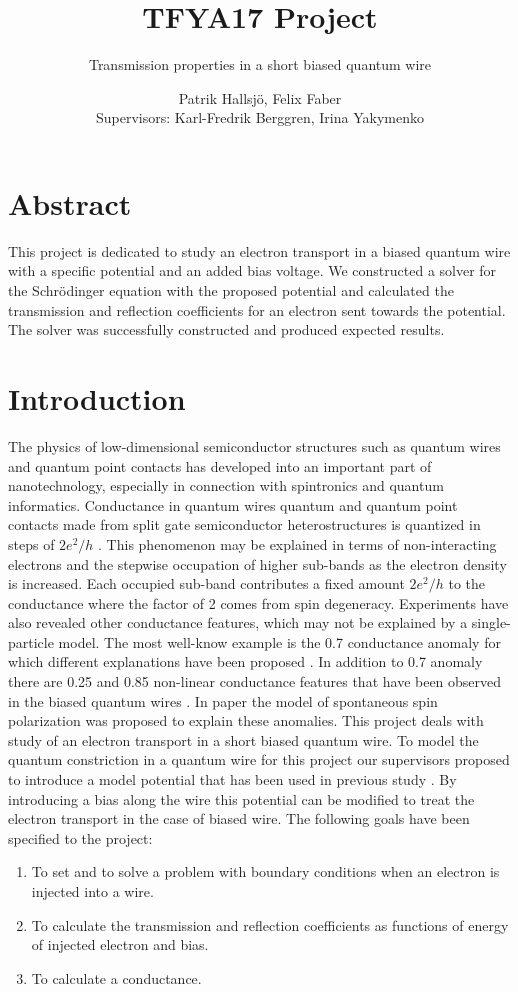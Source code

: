 \documentclass[a4paper]{article}
\subtitle{Transmission properties in a short biased quantum wire}
\title{TFYA17 Project}
\author{Patrik Hallsj\"{o}, Felix Faber \\ Supervisors: Karl-Fredrik Berggren, Irina Yakymenko}
\date{}
\begin{document}
\maketitle

\section*{Abstract}
This project is dedicated to study an electron transport in a biased quantum wire with a specific potential and an added bias voltage. We constructed a solver for the Schr\"odinger equation with the proposed potential and calculated the transmission and reflection coefficients for an electron sent towards the potential. The solver was successfully constructed and produced expected results.

\newpage
\section{Introduction}
The physics of low-dimensional semiconductor structures such as quantum wires and quantum point contacts has developed into an important part of nanotechnology, especially in connection with spintronics and quantum informatics.
Conductance in quantum wires quantum and quantum point contacts  made from split gate semiconductor heterostructures is quantized in steps of $2e^2/h$ \cite{1}.
This phenomenon may be explained in terms of non-interacting electrons and the stepwise occupation of higher sub-bands as the electron density is increased.
Each occupied sub-band contributes a fixed amount $2e^2 /h$  to the conductance where the factor of 2 comes from spin degeneracy.
Experiments have also revealed other conductance features, which may not be explained by a single-particle model.
The most well-know example is the 0.7 conductance anomaly  for which different explanations have been proposed \cite{2}.  In addition to 0.7 anomaly there are  0.25 and 0.85 non-linear conductance features that have been observed in the biased quantum wires \cite{3}.
In paper \cite{4} the model of spontaneous spin polarization was proposed to explain these anomalies.
This project deals with study of an electron transport in a short biased quantum wire. To model the quantum constriction in a quantum wire for this project our supervisors proposed to introduce a model potential that has been used in previous study \cite{5}.
By introducing a bias along the wire this potential can be modified to treat the electron transport in the case of biased wire.
The following goals have been specified to the project:
\begin{enumerate}
\item To set and to solve a problem with boundary conditions when an electron is injected into a wire.
\item To calculate the transmission and reflection coefficients as functions of energy of injected electron and bias.
\item To calculate a conductance.
\end{enumerate}
\end{document}
